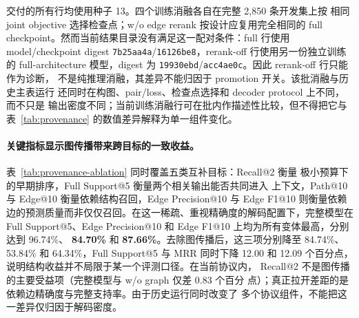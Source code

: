 交付的所有行均使用种子 13。四个训练消融各自在完整 2,850 条开发集上按
相同 joint objective 选择检查点；w/o edge rerank 按设计应复用完全相同的
full checkpoint。然而当前结果目录没有满足这一配对条件：full 行使用
model/checkpoint digest \texttt{7b25aa4a}/\texttt{16126be8}，rerank-off
行使用另一份独立训练的 full-architecture 模型，digest 为
\texttt{19930ebd}/\texttt{acc4ae0c}。因此 rerank-off 行只能作为诊断，
不是纯推理消融，其差异不能归因于 promotion 开关。该批消融与历史主表运行
还同时在构图、pair/loss、检查点选择和 decoder protocol 上不同，而不只是
输出密度不同；当前训练消融行可在批内作描述性比较，但不得把它与
表~\ref{tab:provenance} 的数值差异解释为单一组件变化。

\paragraph{关键指标显示图传播带来跨目标的一致收益。}
表~\ref{tab:provenance-ablation} 同时覆盖五类互补目标：Recall@2 衡量
极小预算下的早期排序，Full Support@5 衡量两个相关输出能否共同进入
上下文，Path@10 与 Edge@10 衡量依赖结构召回，Edge Precision@10 与
Edge F1@10 则衡量依赖边的预测质量而非仅仅召回。在这一稀疏、重视精确度的解码配置下，完整模型在 Full Support@5、Edge
Precision@10 和 Edge F1@10 上均为所有变体最高，分别达到 96.74\%、
\textbf{84.70\%} 和 \textbf{87.66\%}。去除图传播后，这三项分别降至
84.74\%、53.84\% 和 64.34\%，Full Support@5 与 MRR 同时下降 12.00
和 12.09 个百分点，说明结构收益并不局限于某一个评测口径。在当前协议内，
Recall@2 不是图传播的主要受益项（完整模型与 w/o graph 仅差 0.83 个百分
点）；真正拉开差距的是依赖边精确度与完整支持率。由于历史运行同时改变了
多个协议组件，不能把这一差异仅归因于解码密度。

